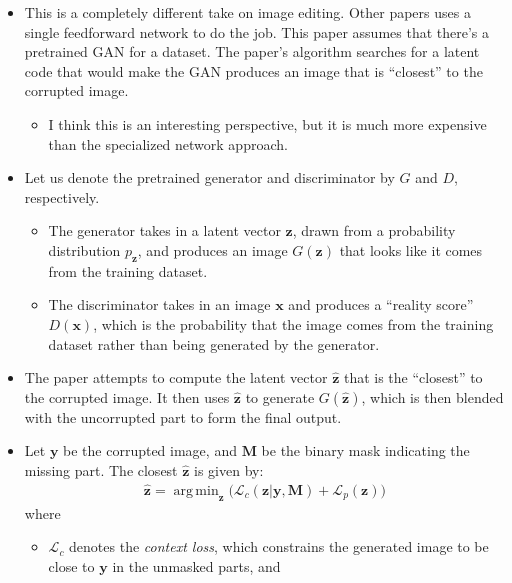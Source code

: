 \documentclass[10pt]{article}
\newcommand{\ve}[1]{\mathbf{#1}}
\DeclareMathOperator*{\argmin}{arg\,min}
\begin{document}
  \begin{itemize}
  	\item This is a completely different take on image editing. Other papers uses a single feedforward network to do the job. This paper assumes that there's a pretrained GAN for a dataset. The paper's algorithm searches for a latent code that would make the GAN produces an image that is ``closest'' to the corrupted image.
  	\begin{itemize}
  		\item I think this is an interesting perspective, but it is much more expensive than the specialized network approach.
  	\end{itemize}

  	\item Let us denote the pretrained generator and discriminator by $G$ and $D$, respectively.
  	\begin{itemize}
  		\item The generator takes in a latent vector $\ve{z}$, drawn from a probability distribution $p_{\ve{z}}$, and produces an image $G(\ve{z})$ that looks like it comes from the training dataset.

  		\item The discriminator takes in an image $\ve{x}$ and produces a ``reality score'' $D(\ve{x})$, which is the probability that the image comes from the training dataset rather than being generated by the generator.  		
  	\end{itemize}

  	\item The paper attempts to compute the latent vector $\hat{\ve{z}}$ that is the ``closest'' to the corrupted image. It then uses $\hat{\ve{z}}$ to generate $G(\hat{\ve{z}})$, which is then blended with the uncorrupted part to form the final output.

  	\item Let $\ve{y}$ be the corrupted image, and $\ve{M}$ be the binary mask indicating the missing part. The closest $\hat{\ve{z}}$ is given by:
  	\begin{align*}
  		\hat{\ve{z}} = \argmin_{\ve{z}} \Big( \mathcal{L}_c (\ve{z} | \ve{y}, \ve{M}) + \mathcal{L}_p(\ve{z}) \Big)
  	\end{align*}
  	where
  	\begin{itemize}
  		\item $\mathcal{L}_c$ denotes the \emph{context loss}, which constrains the generated image to be close to $\ve{y}$ in the unmasked parts, and


\end{itemize}
\end{itemize}
\end{document}

